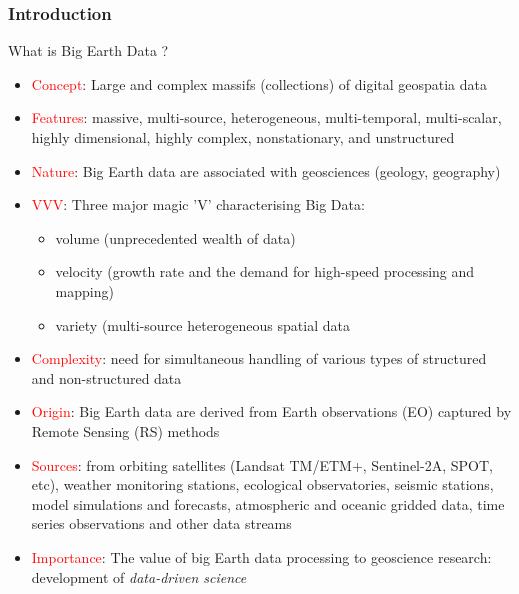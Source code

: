 \documentclass[pdflatex,compress,8pt,
	xcolor={dvipsnames,svgnames,x11names,table},
	hyperref={colorlinks = true,breaklinks = true, urlcolor = NavyBlue}]{beamer}
\begin{document}
\begin{frame}\frametitle{Introduction}
\begin{exampleblock}{What is Big Earth Data ?}
\begin{itemize}
        	\item \textcolor{red}{Concept}: Large and complex massifs (collections) of digital geospatia data
	\item \textcolor{red}{Features}: massive, multi-source, heterogeneous, multi-temporal, multi-scalar, highly dimensional, highly complex, nonstationary, and unstructured
	\item \textcolor{red}{Nature}: Big Earth data are associated with geosciences (geology, geography)
	\item \textcolor{red}{VVV}: Three major magic 'V' characterising Big Data: 
		\begin{itemize}\small
      		  	\item \textcolor{ProcessBlue}{volume} (unprecedented wealth of data)
			\item \textcolor{ProcessBlue}{velocity} (growth rate and the demand for high-speed processing and mapping)
			\item \textcolor{ProcessBlue}{variety} (multi-source heterogeneous spatial data
		\end{itemize}
	\item \textcolor{red}{Complexity}: need for simultaneous handling of various types of structured and non-structured data
	\item \textcolor{red}{Origin}: Big Earth data are derived from Earth observations (EO) captured by Remote Sensing (RS) methods
	\item \textcolor{red}{Sources}: from orbiting satellites (Landsat TM/ETM+, Sentinel-2A, SPOT, etc), weather monitoring stations, ecological observatories, seismic stations, model simulations and forecasts, atmospheric and oceanic gridded data, time series observations and other data streams
	\item \textcolor{red}{Importance}: The value of big Earth data processing to geoscience research: development of \emph{data-driven science}
\end{itemize}
\end{exampleblock}

\end{frame}
\end{document}
